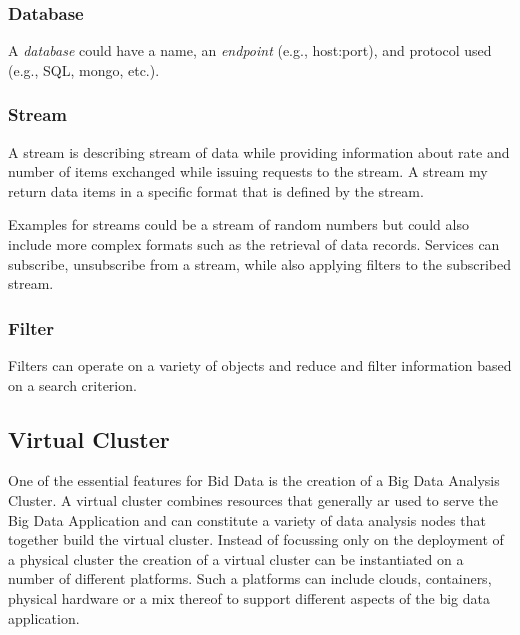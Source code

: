 \documentclass[10pt]{article}
\begin{document}
\subsubsection{Database}

A \textit{database} could have a name, an \textit{endpoint} (e.g., host:port),
and protocol used (e.g., SQL, mongo, etc.).


\subsubsection{Stream} 

A stream is describing stream of data while providing information about
rate and number of items exchanged while issuing requests to the
stream. A stream my return data items in a specific format that is
defined by the stream. 


Examples for streams could be a stream of random numbers but could
also include more complex formats such as the retrieval of data
records. Services can subscribe, unsubscribe from a stream, while also
applying filters to the subscribed stream.


\subsubsection{Filter} 

Filters can operate on a variety of objects and reduce and filter
information based on a search criterion.



\subsection{Virtual Cluster}\label{S:vc}

One of the essential features for Bid Data is the creation of a Big
Data Analysis Cluster.  A virtual cluster combines resources that
generally ar used to serve the Big Data Application and can constitute
a variety of data analysis nodes that together build the virtual
cluster. Instead of focussing only on the deployment of a physical
cluster the creation of a virtual cluster can be instantiated on a
number of different platforms. Such a platforms can include clouds,
containers, physical hardware or a mix thereof to support different
aspects of the big data application. 
\end{document}
